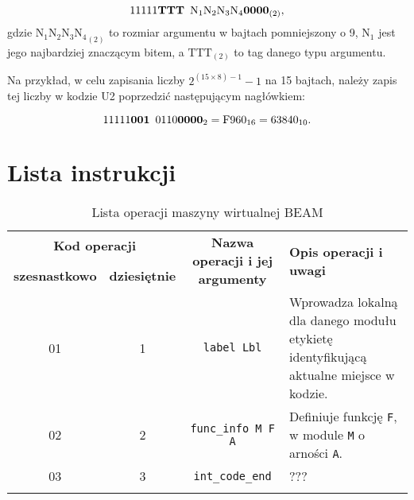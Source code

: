 $$ {11111\text{\textbf{TTT}} \enskip \text{N}_1\text{N}_2\text{N}_3\text{N}_4 \mathbf{0000}}_{(2)}, $$
gdzie ${\text{N}_1\text{N}_2\text{N}_3\text{N}_4}_{(2)}$ to rozmiar argumentu w bajtach pomniejszony o 9, $\text{N}_1$ jest jego najbardziej znaczącym bitem, a $\text{TTT}_{(2)}$ to tag danego typu argumentu.

Na przykład, w celu zapisania liczby $2^{(15 \times 8)-1}-1$ na 15 bajtach, należy zapis tej liczby w kodzie U2 poprzedzić następującym nagłówkiem:

$${11111\mathbf{001} \enskip 0110\mathbf{0000}}_{2} = \text{F}960_{16} = 63840_{10}.$$

\section{Lista instrukcji}
\label{sec:opsOps}

\begin{longtable}{|c|c|c|p{5cm}|}
\hline

\multicolumn{2}{|c|}{\textbf{Kod operacji}} & \multirow{2}{*}{\textbf{Nazwa operacji i jej argumenty}} & \multirow{2}{*}{\textbf{Opis operacji i uwagi}} \\
\cline{1-2}
\textbf{szesnastkowo} & \textbf{dziesiętnie} & & \\
\hline
\endfirsthead

01 & 1 & \texttt{label Lbl} & Wprowadza lokalną dla danego modułu etykietę identyfikującą aktualne miejsce w kodzie. \\
\hline
02 & 2 & \texttt{func\_info M F A} & Definiuje funkcję \texttt{F}, w module \texttt{M} o arności \texttt{A}. \\
\hline
03 & 3 & \texttt{int\_code\_end} & ???  \\
\hline

\caption{Lista operacji maszyny wirtualnej BEAM}  \\
\end{longtable}



















